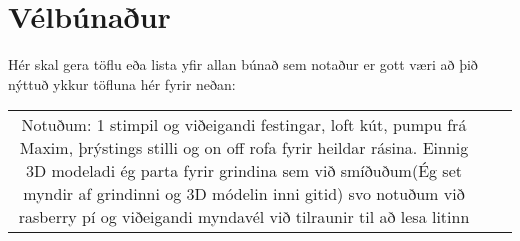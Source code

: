 \section{Vélbúnaður}
Hér skal gera töflu eða lista yfir allan búnað sem notaður er gott væri að þið nýttuð ykkur töfluna hér fyrir neðan:

\begin{center}
\begin{tabular}{ |c|c|c| } 
 \hline
Notuðum: 1 stimpil og viðeigandi festingar, loft kút, pumpu frá Maxim, þrýstings stilli og on off rofa fyrir heildar rásina. Einnig 3D modeladi ég parta fyrir grindina sem við smíðuðum(Ég set myndir af grindinni og 3D módelin inni gitid) svo notuðum við rasberry pí og viðeigandi myndavél við tilraunir til að lesa litinn
 \hline
\end{tabular}
\end{center}
